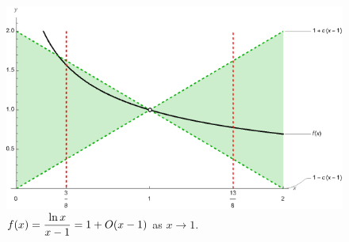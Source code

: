 \begin{figure}[H]
\includegraphics[width=6.5in]{img/power_series_and_limits1}
\caption{$f(x)=\displaystyle\frac{\ln x}{x-1} = 1 + O(x-1)$ as $x\to 1$.}
\end{figure}

\newpage

